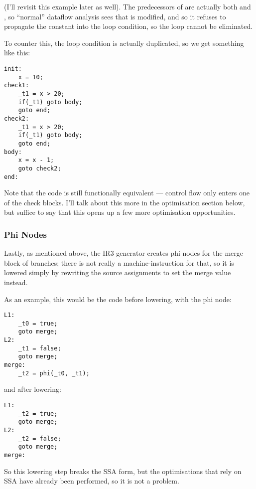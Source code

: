 \documentclass[12pt]{article}
\begin{document}
(I'll revisit this example later as well). The predecessors of  are actually both  and ,
so \enquote{normal} dataflow analysis sees that  is modified, and so it refuses to propagate the constant into the
loop condition, so the loop cannot be eliminated.

To counter this, the loop condition is actually duplicated, so we get something like this:

\begin{verbatim}
init:
	x = 10;
check1:
	_t1 = x > 20;
	if(_t1) goto body;
	goto end;
check2:
	_t1 = x > 20;
	if(_t1) goto body;
	goto end;
body:
	x = x - 1;
	goto check2;
end:
\end{verbatim}

Note that the code is still functionally equivalent --- control flow only enters one of the check blocks. I'll talk about
this more in the optimisation section below, but suffice to say that this opens up a few more optimisation opportunities.







\subsubsection{Phi Nodes}

Lastly, as mentioned above, the IR3 generator creates phi nodes for the merge block of branches; there is not really
a machine-instruction for that, so it is lowered simply by rewriting the source assignments to set the merge value
instead.

As an example, this would be the code before lowering, with the phi node:

\begin{verbatim}
L1:
	_t0 = true;
	goto merge;
L2:
	_t1 = false;
	goto merge;
merge:
	_t2 = phi(_t0, _t1);
\end{verbatim}

and after lowering:

\begin{verbatim}
L1:
	_t2 = true;
	goto merge;
L2:
	_t2 = false;
	goto merge;
merge:
\end{verbatim}

So this lowering step breaks the SSA form, but the optimisations that rely on SSA have already been performed, so it
is not a problem.

\end{document}
